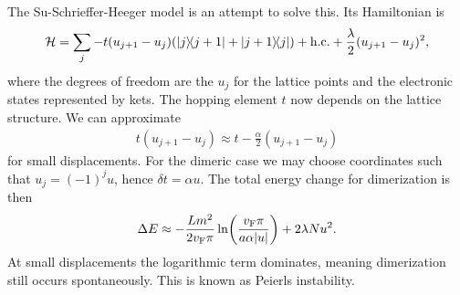 The Su-Schrieffer-Heeger model is an attempt to solve this. Its Hamiltonian is
\begin{align*}
	\mathcal{H} = \sum\limits_{j}-t(u_{j + 1} - u_{j})(\op{j}{j + 1} + \op{j + 1}{j}) + \text{h.c.} + \frac{\lambda}{2}(u_{j + 1} - u_{j})^{2},
\end{align*}
where the degrees of freedom are the $u_{j}$ for the lattice points and the electronic states represented by kets. The hopping element $t$ now depends on the lattice structure. We can approximate
\begin{align*}
	t(u_{j + 1} - u_{j}) \approx t - \frac{\alpha}{2}(u_{j + 1} - u_{j})
\end{align*}
for small displacements. For the dimeric case we may choose coordinates such that $u_{j} = (-1)^{j}u$, hence $\delta t = \alpha u$. The total energy change for dimerization is then
\begin{align*}
	\Delta E\approx -\frac{Lm^{2}}{2v_{\text{F}}\pi}\ln(\frac{v_{\text{F}}\pi}{a\alpha \abs{u}}) + 2\lambda Nu^{2}.
\end{align*}
At small displacements the logarithmic term dominates, meaning dimerization still occurs spontaneously. This is known as Peierls instability.

